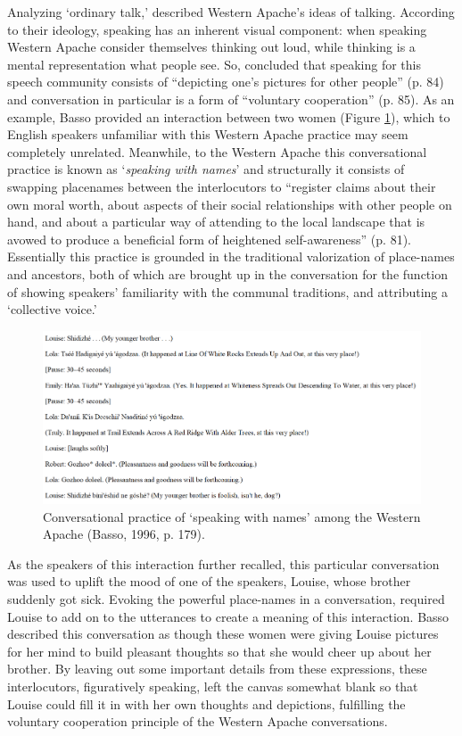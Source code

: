 \documentclass[12pt]{article}
\begin{document}
Analyzing `ordinary talk,' \textcite{basso1996} described Western Apache's ideas of talking. According to their ideology, speaking has an inherent visual component: when speaking Western Apache consider themselves thinking out loud, while thinking is a mental representation what people see. So, \textcite{basso1996} concluded that speaking for this speech community consists of ``depicting one's pictures for other people'' (p. 84) and conversation in particular is a form of ``voluntary cooperation'' (p. 85). As an example, Basso provided an interaction between two women (Figure \ref{speaking_names}), which to English speakers unfamiliar with this Western Apache practice may seem completely unrelated. Meanwhile, to the Western Apache this conversational practice is known as `\textit{speaking with names}' and structurally it consists of swapping placenames between the interlocutors to ``register claims about their own moral worth, about aspects of their social relationships with other people on hand, and about a particular way of attending to the local landscape that is avowed to produce a beneficial form of heightened self-awareness'' (p. 81). Essentially this practice is grounded in the traditional valorization of place-names and ancestors, both of which are brought up in the conversation for the function of showing speakers' familiarity with the communal traditions, and attributing a `collective voice.' 
\begin{figure}[ht]
\caption{Conversational practice of `speaking with names' among the Western Apache (Basso, 1996, p. 179).}
\label{speaking_names}
\includegraphics[width=7in]{speaking_names.png}
\end{figure}

As the speakers of this interaction further recalled, this particular conversation was used to uplift the mood of one of the speakers, Louise, whose brother suddenly got sick. Evoking the powerful place-names in a conversation, required Louise to add on to the utterances to create a meaning of this interaction. Basso described this conversation as though these women were giving Louise pictures for her mind to build pleasant thoughts so that she would cheer up about her brother. By leaving out some important details from these expressions, these interlocutors, figuratively speaking, left the canvas somewhat blank so that Louise could fill it in with her own thoughts and depictions, fulfilling the voluntary cooperation principle of the Western Apache conversations. 
\end{document}
